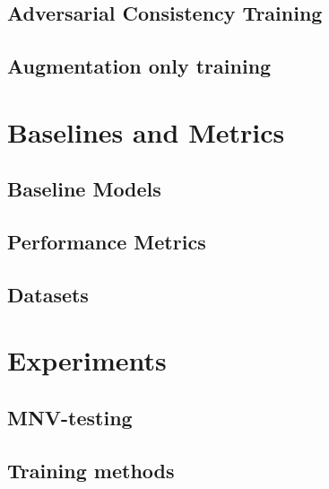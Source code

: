		\subsection{Adversarial Consistency Training}
		\subsection{Augmentation only training}
\section{Baselines and Metrics}
    \subsection{Baseline Models}
    \subsection{Performance Metrics}
    \subsection{Datasets}
\section{Experiments}
    \subsection{MNV-testing}
	\subsection{Training methods}

